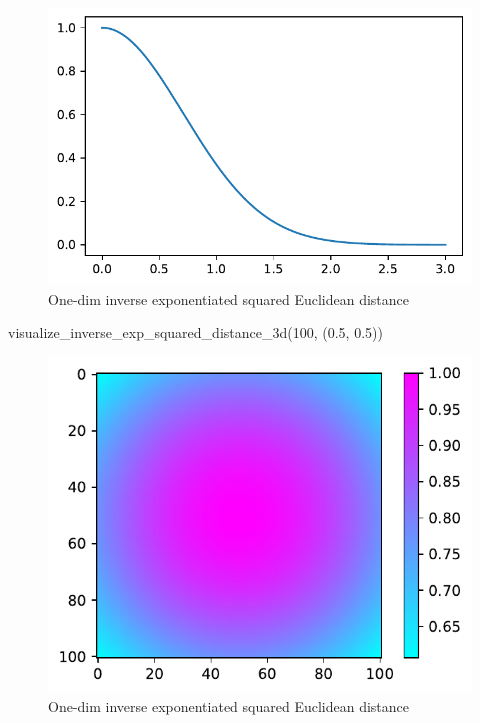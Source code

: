 \documentclass[
  letterpaper,
  DIV=11,
  numbers=noendperiod]{scrreprt}
\newenvironment{Shaded}{\begin{snugshade}}{\end{snugshade}}
\newcommand{\DecValTok}[1]{\textcolor[rgb]{0.68,0.00,0.00}{#1}}
\newcommand{\FloatTok}[1]{\textcolor[rgb]{0.68,0.00,0.00}{#1}}
\newcommand{\NormalTok}[1]{\textcolor[rgb]{0.00,0.23,0.31}{#1}}
\begin{document}
\begin{figure}[H]

{\centering \includegraphics{006_num_gp_files/figure-pdf/fig-exp2euclid-output-1.pdf}

}

\caption{\label{fig-exp2euclid}One-dim inverse exponentiated squared
Euclidean distance}

\end{figure}

\begin{Shaded}
\begin{Highlighting}[]
\NormalTok{visualize\_inverse\_exp\_squared\_distance\_3d(}\DecValTok{100}\NormalTok{, (}\FloatTok{0.5}\NormalTok{, }\FloatTok{0.5}\NormalTok{))}
\end{Highlighting}
\end{Shaded}

\begin{figure}[H]

{\centering \includegraphics{006_num_gp_files/figure-pdf/fig-exp2euclid2d-output-1.pdf}

}

\caption{\label{fig-exp2euclid2d}One-dim inverse exponentiated squared
Euclidean distance}

\end{figure}
\end{document}
